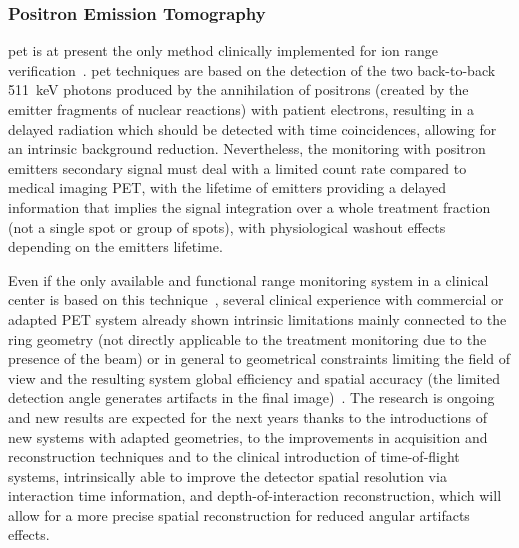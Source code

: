

\subsubsection{Positron Emission Tomography}\label{chap1::subsec::RangePET}
\gls{pet} is at present the only method clinically implemented for ion range verification~\parencite{Hishikawa2002, Enghardt2004, Parodi2007, Bauer2013}. \gls{pet} techniques are based on the detection of the two back-to-back 511~keV photons produced by the annihilation of positrons (created by the emitter fragments of nuclear reactions) with patient electrons, resulting in a delayed radiation which should be detected with time coincidences, allowing for an intrinsic background reduction. Nevertheless, the monitoring with positron emitters secondary signal must deal with a limited count rate compared to medical imaging PET, with the lifetime of emitters providing a delayed information that implies the signal integration over a whole treatment fraction (not a single spot or group of spots), with physiological washout effects depending on the emitters lifetime.

Even if the only available and functional range monitoring system in a clinical center is based on this technique~\parencite{Enghardt2004}, several clinical experience with commercial or adapted PET system already shown intrinsic limitations mainly connected to the ring geometry (not directly applicable to the treatment monitoring due to the presence of the beam) or in general to geometrical constraints limiting the field of view and the resulting system global efficiency and spatial accuracy (the limited detection angle generates artifacts in the final image)~\parencite{Parodi2016}. The research is ongoing and new results are expected for the next years thanks to the introductions of new systems with adapted geometries, to the improvements in acquisition and reconstruction techniques and to the clinical introduction of time-of-flight systems, intrinsically able to improve the detector spatial resolution via interaction time information, and depth-of-interaction reconstruction, which will allow for a more precise spatial reconstruction for reduced angular artifacts effects.

